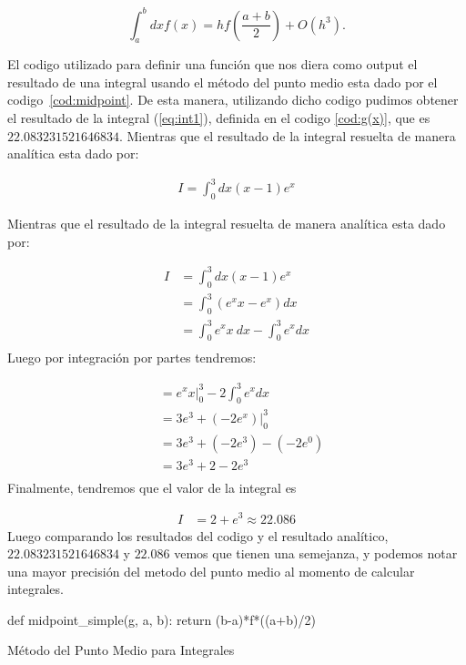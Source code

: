 \documentclass[../portafolio.tex]{subfiles}
\begin{document}
\begin{equation}
	\int_{a}^{b}dx f(x) = h f\left(\frac{a+b}{2}\right) + O(h^{3}). \label{integralfinal}
\end{equation}

El codigo utilizado para definir una funci\'on que nos diera como output el resultado de una integral usando el m\'etodo del punto medio esta dado por el codigo~\ref{cod:midpoint}. De esta manera, utilizando dicho codigo pudimos obtener el resultado de la integral (\ref{eq:int1}), definida en el codigo \ref{cod:g(x)}, que es $22.083231521646834$. Mientras que el resultado de la integral resuelta de manera anal\'itica esta dado por:

	\begin{align}
		I = \int_0^3 dx (x-1)e^x \label{eq:int1}
	\end{align}

Mientras que el resultado de la integral resuelta de manera anal\'itica esta dado por:
	
	\begin{align*}
		I &= \int_0^3 dx (x-1)e^x \\
		&= \int_0^3 (e^x x - e^x) dx \\
		&= \int_0^3 e^x x~dx - \int_0^3 e^x dx \\			
	\end{align*}
Luego por integraci\'on por partes tendremos:

	\begin{align*}
		  &= e^x x\Big|_0^3 -2 \int_0^3 e^x dx \\
		  &= 3e^3 + ( -2e^x ) \Big|_0^3 \\
		  &= 3e^3 + (-2e^3)-(-2e^0) \\
		  &= 3e^3 + 2 - 2e^3 \\
	\end{align*}
Finalmente, tendremos que el valor de la integral es 

	\begin{align*}
				I &= 2 + e^3 \approx 22.086
	\end{align*}
Luego comparando los resultados del codigo y el resultado anal\'itico, $22.083231521646834$ y $22.086$ vemos que tienen una semejanza, y podemos notar una mayor precisi\'on del metodo del punto medio al momento de calcular integrales.
\begin{listing}
	\begin{pythoncode}
def midpoint_simple(g, a, b):
    return (b-a)*f*((a+b)/2)	
	\end{pythoncode}
	\caption{M\'etodo del Punto Medio para Integrales}
	\label{cod:midpoint}
\end{listing}
\end{document}
